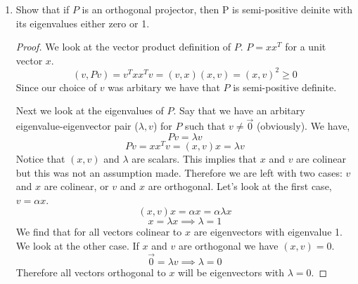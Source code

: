 \documentclass{article}
\DeclareMathOperator{\vecspan}{span}
\begin{document}
\begin{enumerate}
\begin{enumerate}
\begin{proof}
        We begin by looking at the definition of the two norm for matrices. We have, 
        \[
            ||P||_2 = \sup_{x} \frac{||Px||_2}{||x||_2} = 1
        \]
        Therefore the case exists such that we find, 
        \[
            ||Px||_2 = ||x||_2
        \]
        We then introduce the fact that a two norm of a vector is the square root of the inner product of that vector with itself. That is $||v||_2 = \sqrt{(v, v)}$. Thus we have, 
        \[
            \sqrt{x^TP^TPx} = \sqrt{x^Tx}
        \]
        \[
            x^TP^TPx = x^Tx
        \]
        \[
            P^TPx = x = PPx, \quad \text{by definition of a projector}
        \]
        \[
            P^TPx = PPx, \implies P^Ty = Py
        \]
        This implies that for any vector in the span of $v$ (We take $P: \R^m \to \vecspan(v)$), that $P^T = P$. Moreover we have that for any vector $x$, $P^TP = P^2$. If we take $P$ to be invertible, we have that $P^T = P$. Therefore, we have that $P$ is idempotent and symmetric, making it an orthogonal projector. 
        
    \end{proof}

    \item Show that if $P$ is an orthogonal projector, then P is semi-positive deinite with its eigenvalues either zero or 1. 
        \begin{proof}
            We look at the vector product definition of $P$. $P = xx^T$ for a unit vector $x$. 
            \[
                (v, Pv) = v^Txx^Tv = (v, x)(x, v) = (x, v)^2 \ge 0
            \]
            Since our choice of $v$ was arbitary we have that $P$ is semi-positive definite. 
            
            Next we look at the eigenvalues of $P$. Say that we have an arbitary eigenvalue-eigenvector pair ($\lambda, v$) for $P$ such that $v \neq \vec{0}$ (obviously). We have,
            \[
                Pv = \lambda v
            \]
            \[
                Pv = xx^Tv = (x, v)x = \lambda v
            \]
            Notice that $(x, v)$ and $\lambda$ are scalars. This implies that $x$ and $v$ are colinear but this was not an assumption made. Therefore we are left with two cases: $v$ and $x$ are colinear, or $v$ and $x$ are orthogonal. Let's look at the first case, $v = \alpha x$.
            \[
                (x, v)x = \alpha x = \alpha\lambda x
            \] 
            \[
                x = \lambda x \implies \lambda = 1
            \]
            We find that for all vectors colinear to $x$ are eigenvectors with eigenvalue 1. We look at the other case. If $x$ and $v$ are orthogonal we have $(x, v) = 0$. 
            \[
                \vec{0} = \lambda v \implies \lambda = 0
            \]
            Therefore all vectors orthogonal to $x$ will be eigenvectors with $\lambda = 0$. 
        \end{proof}
\end{enumerate}


\end{enumerate}
\end{document}
